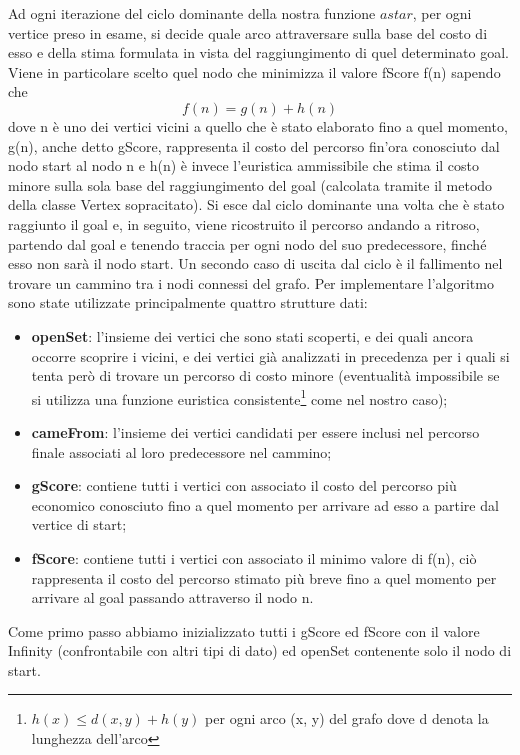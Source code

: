 \documentclass[12pt,a4paper]{report}
\begin{document}
Ad ogni iterazione del ciclo dominante della nostra funzione \(astar\), per ogni vertice preso in esame, si decide quale arco attraversare sulla base del costo di esso e della stima formulata in vista del raggiungimento di quel determinato goal.
Viene in particolare scelto quel nodo che minimizza il valore fScore f(n) sapendo che\[f(n) = g(n) + h(n)\]dove n è uno dei vertici vicini a quello che è stato elaborato fino a quel momento, g(n), anche detto gScore, rappresenta il costo del percorso fin'ora conosciuto dal nodo start al nodo n e h(n) è invece l'euristica ammissibile che stima il costo minore sulla sola base del raggiungimento del goal (calcolata tramite il metodo della classe Vertex sopracitato). Si esce dal ciclo dominante una volta che è stato raggiunto il goal e, in seguito, viene ricostruito il percorso andando a ritroso, partendo dal goal e tenendo traccia per ogni nodo del suo predecessore, finché esso non sarà il nodo start. 
Un secondo caso di uscita dal ciclo è il fallimento nel trovare un cammino tra i nodi connessi del grafo.
\newpage
Per implementare l'algoritmo sono state utilizzate principalmente quattro strutture dati:
\begin{itemize}
	\item \textbf{openSet}: l'insieme dei vertici che sono stati scoperti, e dei quali ancora occorre scoprire i vicini, e dei vertici già analizzati in precedenza per i quali si tenta però di trovare un percorso di costo minore (eventualità impossibile se si utilizza una funzione euristica consistente\footnote[1]{\(h(x) \leq d(x, y) + h(y)\) per ogni arco (x, y) del grafo dove d denota la lunghezza dell'arco} come nel nostro caso); 
	\item \textbf{cameFrom}: l'insieme dei vertici candidati per essere inclusi nel percorso finale associati al loro predecessore nel cammino;
	\item \textbf{gScore}: contiene tutti i vertici con associato il costo del percorso più economico conosciuto fino a quel momento per arrivare ad esso a partire dal vertice di start;
	\item \textbf{fScore}:  contiene tutti i vertici con associato il minimo valore di f(n), ciò rappresenta il costo del percorso stimato più breve fino a quel momento per arrivare al goal passando attraverso il nodo n. 
\end{itemize}

Come primo passo abbiamo inizializzato tutti i gScore ed fScore con il valore Infinity (confrontabile con altri tipi di dato) ed openSet contenente solo il nodo di start.
\end{document}
